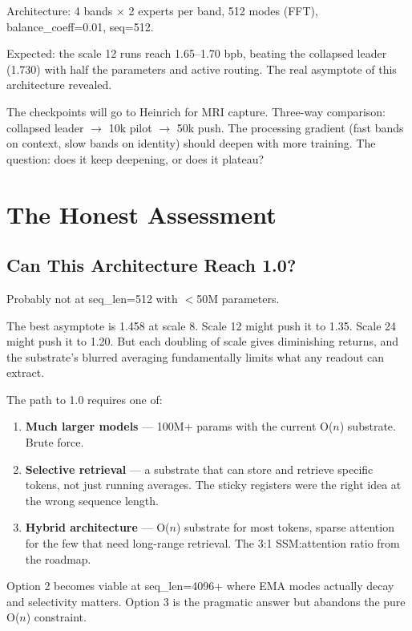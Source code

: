 \documentclass[11pt,a4paper]{report}
\begin{document}
Architecture: 4 bands $\times$ 2 experts per band, 512 modes (FFT), balance\_coeff=0.01, seq=512.

Expected: the scale 12 runs reach 1.65--1.70 bpb, beating the collapsed leader (1.730) with half the parameters and active routing. The real asymptote of this architecture revealed.

The checkpoints will go to Heinrich for MRI capture. Three-way comparison: collapsed leader $\to$ 10k pilot $\to$ 50k push. The processing gradient (fast bands on context, slow bands on identity) should deepen with more training. The question: does it keep deepening, or does it plateau?

\part{The Honest Assessment}

\chapter{Can This Architecture Reach 1.0?}

Probably not at seq\_len=512 with $<$50M parameters.

The best asymptote is 1.458 at scale 8. Scale 12 might push it to 1.35. Scale 24 might push it to 1.20. But each doubling of scale gives diminishing returns, and the substrate's blurred averaging fundamentally limits what any readout can extract.

The path to 1.0 requires one of:
\begin{enumerate}[nosep]
\item \textbf{Much larger models} --- 100M+ params with the current O($n$) substrate. Brute force.
\item \textbf{Selective retrieval} --- a substrate that can store and retrieve specific tokens, not just running averages. The sticky registers were the right idea at the wrong sequence length.
\item \textbf{Hybrid architecture} --- O($n$) substrate for most tokens, sparse attention for the few that need long-range retrieval. The 3:1 SSM:attention ratio from the roadmap.
\end{enumerate}

Option 2 becomes viable at seq\_len=4096+ where EMA modes actually decay and selectivity matters. Option 3 is the pragmatic answer but abandons the pure O($n$) constraint.
\end{document}
